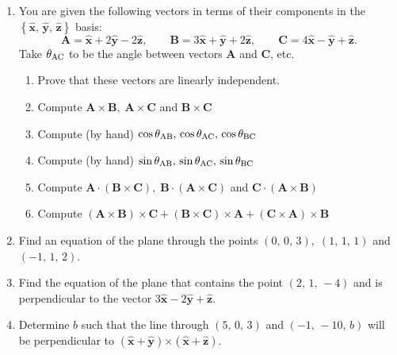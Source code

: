 \documentclass[fleqn]{article}
\begin{document}
\begin{enumerate}

  \item You are given the following vectors in terms of their components in
  the $\left\{ \mathbf{\hat{x}},\,\mathbf{\hat{y}},\mathbf{\, \hat{z}}\right\} $ basis: 
  \[
  \mathbf{A}=\mathbf{\hat{x}}+2\mathbf{\hat{y}-}2\mathbf{\hat{z}, \quad \quad B}=3\mathbf{\hat{x}}+\mathbf{\hat{y}+}2\mathbf{\hat{z}, \quad \quad C}=4\mathbf{\hat{x}}-\mathbf{\hat{y}+\hat{z}.}
  \]
  Take $\theta_{\rm AC}$ to be the angle between vectors $\mathbf{A}$ and $\mathbf{C}$, etc. 
  
  \begin{enumerate}
    \item Prove that these vectors are linearly independent. 
    
    \item Compute  $\mathbf{A\times B,\;A\times C}$ and $\mathbf{B\times C}$
    
    \item Compute (by hand) $\cos \theta_{\rm AB},\,\cos \theta_{\rm AC},\,\cos \theta_{\rm BC}$
    
    \item Compute (by hand) $\sin \theta_{\rm AB},\,\sin \theta_{\rm AC},\,\sin \theta_{\rm BC}$
    
    \item Compute $\mathbf{A\cdot }\left( \mathbf{B\times C}\right) ,\;\mathbf{B\cdot }\left( \mathbf{A\times C}\right) $ and $\mathbf{C\cdot }\left( \mathbf{A\times B}\right)$
    
    \item Compute $\left( \mathbf{A\times B}\right) \times \mathbf{C+}\left( \mathbf{B\times C}\right) \times \mathbf{A+}\left( \mathbf{C\times A}\right) \times \mathbf{B}$
  \end{enumerate}
  
  
  \item Find an equation of the plane through the points $\left(
  0,\,0,\,3\right) ,\;\left( 1,\,1,\,1\right) $ and $\left( -1,\,1,\,2\right) $.
  
  \item Find the equation of the plane that contains the point $\left(
  2,\,1,\,-4\right) $ and is perpendicular to the vector $3\mathbf{\hat{x}}-2\mathbf{\hat{y}}+\mathbf{\hat{z}}.$
  
  \item Determine $b$ such that the line through $\left( 5,\,0,\,3\right) $ and $\left( -1,\,-10,\,b\right) $ will be perpendicular to $\left( \mathbf{\hat{x}+\hat{y}}\right) \mathbf{\times }\left( \mathbf{\hat{x}+\hat{z}}\right)$.
  

\end{enumerate}
\end{document}
